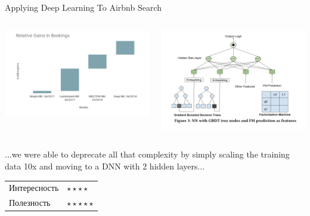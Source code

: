 \documentclass[11pt,aspectratio=169]{beamer}
\begin{document}
\begin{frame}{Applying Deep Learning To Airbnb Search \cite{AIRBNB}}

\begin{columns}
\begin{column}{0.45\textwidth} 
\begin{center}
\includegraphics[scale=0.3]{images/airbnb-progression.png}
\end{center}
\end{column}
\begin{column}{0.45\textwidth}
\begin{center}
\includegraphics[scale=0.3]{images/airbnb-gbdt.png}
\end{center}
\end{column}
\end{columns}

\begin{tcolorbox}[colback=info!5,colframe=info!80,title=]
...we were able to deprecate all that complexity by simply scaling the training data 10x and moving to a DNN with 2 hidden layers...
\end{tcolorbox}

\begin{tabular}{l l}
Интересность & $\star\star\star\star$ \\
Полезность & $\star\star\star\star\star$
\end{tabular}

\end{frame}
\end{document}
